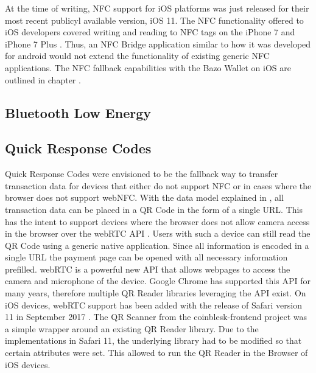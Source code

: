 At the time of writing, NFC support for iOS platforms was just released for their most recent publicyl available version, iOS 11. The NFC functionality offered to iOS developers covered writing and reading to NFC tags on the iPhone 7 and iPhone 7 Plus \cite{corenfc}. Thus, an NFC Bridge application similar to how it was developed for android would not extend the functionality of existing generic NFC applications. The NFC fallback capabilities with the Bazo Wallet on iOS are outlined in chapter \cite{undefined}.
\subsection{Bluetooth Low Energy}
\subsection{Quick Response Codes}
Quick Response Codes were envisioned to be the fallback way to transfer transaction data for devices that either do not support NFC or in cases where the browser does not support webNFC. With the data model explained in \cite{undefined}, all transaction data can be placed in a QR Code in the form of a single URL.
This has the intent to support devices where the browser does not allow camera access in the browser over the webRTC API \cite{undefined}. Users with such a device can still read the QR Code using a generic native application. Since all information is encoded in a single URL the payment page can be opened with all necessary information prefilled.
webRTC is a powerful new API that allows webpages to access the camera and microphone of the device. Google Chrome has supported this API for many years, therefore multiple QR Reader libraries leveraging the API exist.
On iOS devices, webRTC support has been added with the release of Safari version 11 in September 2017 \cite{safari11release}.
The QR Scanner from the coinblesk-frontend project was a simple wrapper around an existing QR Reader library. Due to the implementations in Safari 11, the underlying library had to be modified so that certain attributes were set. This allowed to run the QR Reader in the Browser of iOS devices.

